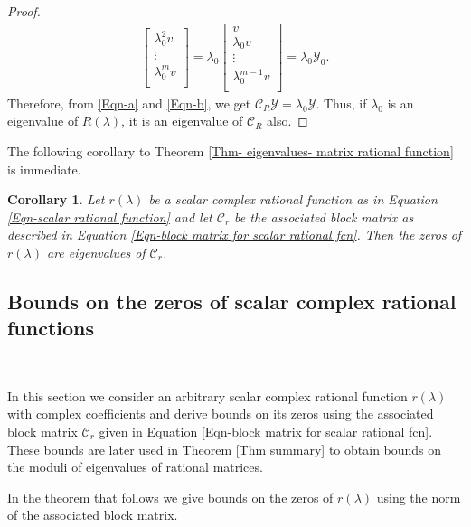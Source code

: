 \documentclass[12pt, reqno]{amsart}
\newtheorem{corollary}[theorem]{Corollary}
\theoremstyle{definition}
\theoremstyle{remark}
\numberwithin{equation}{section}
\begin{document}
\begin{proof}
\begin{align}
\begin{bmatrix}
    \lambda_0^2v\\
    \vdots\\
    \lambda_0^mv\\
\end{bmatrix}
=\lambda_0 \begin{bmatrix}
    v\\
    \lambda_0v\\
    \vdots\\
    \lambda_0^{m-1}v\\
\end{bmatrix}=\lambda_0\mathcal{Y}_0 \label{Eqn-b}.
\end{align}
Therefore, from \eqref{Eqn-a} and \eqref{Eqn-b}, we get $\mathcal{C}_R \mathcal{Y} 
= \lambda_0 \mathcal{Y}$. Thus, if $\lambda_0$ is an eigenvalue of $R(\lambda)$, it 
is an eigenvalue of $\mathcal{C}_R$ also.

\end{proof}


\noindent
The following corollary to Theorem \ref{Thm- eigenvalues- matrix rational function} 
is immediate.

\begin{corollary}\label{Cor-zeros of rational function}
Let $r(\lambda)$ be a scalar complex rational function as in Equation 
\eqref{Eqn-scalar rational function} and let $\mathcal{C}_r$ be the associated 
block matrix as described in Equation \eqref{Eqn-block matrix for scalar rational fcn}. 
Then the zeros of $r(\lambda)$ are eigenvalues of $\mathcal{C}_r$.
\end{corollary}


\subsection{Bounds on the zeros of scalar complex rational functions}\label{sec-3.2}

\

In this section we consider an arbitrary scalar complex rational function 
$r(\lambda)$ with complex coefficients and derive  bounds on its zeros using the 
associated block matrix $\mathcal{C}_r$ given in Equation \eqref{Eqn-block matrix 
for scalar rational fcn}. These bounds are later used in Theorem \ref{Thm summary} 
to obtain bounds on the moduli of eigenvalues of rational matrices.

\medskip
\noindent
In the theorem that follows we give bounds on the zeros of $r(\lambda)$ using the 
norm of the associated block matrix.
\end{document}
